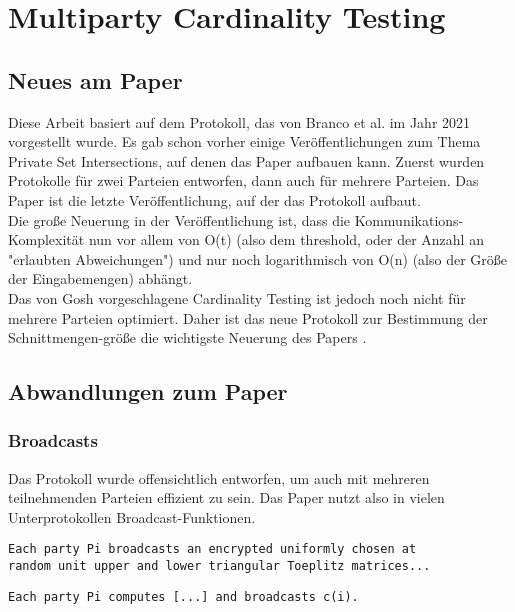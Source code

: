 \chapter{Multiparty Cardinality Testing}


\section{Neues am Paper}
Diese Arbeit basiert auf dem Protokoll, das von Branco et al. im Jahr 2021 \cite{Doettling2021} vorgestellt wurde. Es gab schon vorher einige Veröffentlichungen zum Thema Private Set Intersections, auf denen das Paper aufbauen kann. Zuerst wurden Protokolle für zwei Parteien entworfen, dann auch für mehrere Parteien. Das Paper
\cite{Ghosh2019} ist die letzte Veröffentlichung, auf der das Protokoll aufbaut.\\
Die große Neuerung in der Veröffentlichung \cite{Ghosh2019} ist, dass die Kommunikations-Komplexität nun vor allem von O(t) (also dem threshold, oder der Anzahl an "erlaubten Abweichungen") und nur noch logarithmisch von O(n) (also der Größe der Eingabemengen) abhängt. \cite{Ghosh2019}\\
Das von Gosh vorgeschlagene Cardinality Testing ist jedoch noch nicht  für mehrere Parteien optimiert. Daher ist das neue Protokoll zur Bestimmung der Schnittmengen-größe die wichtigste Neuerung des Papers \cite{Doettling2021}.


\section{Abwandlungen zum Paper} \label{Änderungen}
\subsection{Broadcasts}
Das Protokoll wurde offensichtlich entworfen, um auch mit mehreren teilnehmenden Parteien effizient zu sein.
Das Paper \cite{Doettling2021} nutzt also in vielen Unterprotokollen Broadcast-Funktionen.

\begin{lstlisting}[firstnumber=1, caption = 
Beispiel: secRank \cite{Doettling2021}]
Each party Pi broadcasts an encrypted uniformly chosen at
random unit upper and lower triangular Toeplitz matrices...
\end{lstlisting}


\begin{lstlisting}[firstnumber=6, caption = 
Beispiel: secMult \cite{Doettling2021}]
Each party Pi computes [...] and broadcasts c(i).
\end{lstlisting}


